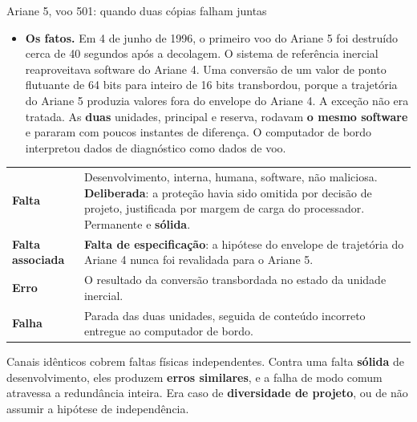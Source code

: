 \documentclass{beamer}
\begin{document}
\begin{frame}{Ariane 5, voo 501: quando duas c\'opias falham juntas}
    \footnotesize
    \begin{itemize}
        \item \textbf{Os fatos.} Em 4 de junho de 1996, o primeiro voo do Ariane 5 foi destru\'ido cerca de 40 segundos ap\'os a decolagem. O sistema de refer\^encia inercial reaproveitava software do Ariane 4. Uma convers\~ao de um valor de ponto flutuante de 64 bits para inteiro de 16 bits transbordou, porque a trajet\'oria do Ariane 5 produzia valores fora do envelope do Ariane 4. A exce\c{c}\~ao n\~ao era tratada. As \textbf{duas} unidades, principal e reserva, rodavam \textbf{o mesmo software} e pararam com poucos instantes de diferen\c{c}a. O computador de bordo interpretou dados de diagn\'ostico como dados de voo.
    \end{itemize}
    \medskip
    \begin{tabularx}{\linewidth}{@{}p{2.6cm} >{\raggedright\arraybackslash}X@{}}
        \toprule
        \textbf{Falta} & Desenvolvimento, interna, humana, software, n\~ao maliciosa. \textbf{Deliberada}: a prote\c{c}\~ao havia sido omitida por decis\~ao de projeto, justificada por margem de carga do processador. Permanente e \textbf{s\'olida}. \\
        \textbf{Falta associada} & \textbf{Falta de especifica\c{c}\~ao}: a hip\'otese do envelope de trajet\'oria do Ariane 4 nunca foi revalidada para o Ariane 5. \\
        \textbf{Erro} & O resultado da convers\~ao transbordada no estado da unidade inercial. \\
        \textbf{Falha} & Parada das duas unidades, seguida de conte\'udo incorreto entregue ao computador de bordo. \\
        \bottomrule
    \end{tabularx}
    \medskip
    \begin{ancora}
        \footnotesize
        Canais id\^enticos cobrem faltas f\'isicas independentes. Contra uma falta \textbf{s\'olida} de desenvolvimento, eles produzem \textbf{erros similares}, e a falha de modo comum atravessa a redund\^ancia inteira. Era caso de \textbf{diversidade de projeto}, ou de n\~ao assumir a hip\'otese de independ\^encia.
    \end{ancora}
\end{frame}
\end{document}
